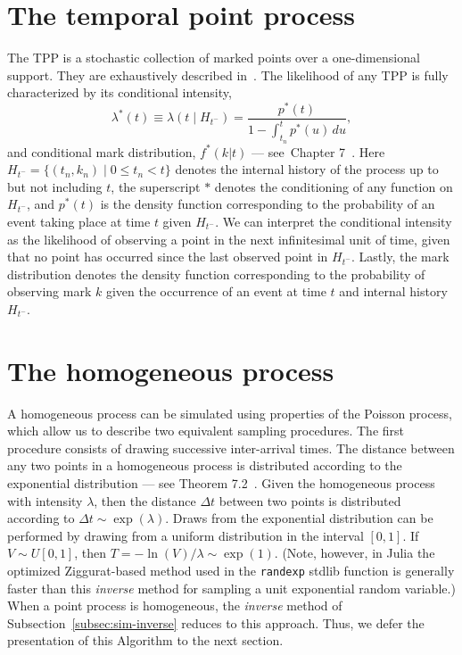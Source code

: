 \documentclass{juliacon}
\numberwithin{equation}{section}
\begin{document}
\section{The temporal point process} \label{sec:notation}

The TPP is a stochastic collection of marked points over a one-dimensional support. They are exhaustively described in~\cite{daley2003}. The likelihood of any TPP is fully characterized by its conditional intensity,
\begin{equation}\label{eq:lambda}
  \lambda^\ast (t) \equiv \lambda(t \mid H_{t^-} ) = \frac{p^\ast(t)}{1 - \int_{t_n}^{t} p^\ast(u) \, du},
\end{equation}
and conditional mark distribution, \( f^*(k | t) \) --- see~Chapter 7~\cite{daley2003}. Here \( H_{t^-} = \{ (t_n, k_n) \mid 0 \leq t_n < t \} \) denotes the internal history of the process up to but not including \( t \), the superscript \( \ast \) denotes the conditioning of any function on \( H_{t^-} \), and \( p^\ast(t) \) is the density function corresponding to the probability of an event taking place at time \( t \) given \( H_{t^-} \). We can interpret the conditional intensity as the likelihood of observing a point in the next infinitesimal unit of time, given that no point has occurred since the last observed point in \( H_{t^-} \). Lastly, the mark distribution denotes the density function corresponding to the probability of observing mark \( k \) given the occurrence of an event at time \( t \) and internal history \( H_{t^-} \).

\section{The homogeneous process} \label{sec:method-poisson}

A homogeneous process can be simulated using properties of the Poisson process, which allow us to describe two equivalent sampling procedures. The first procedure consists of drawing successive inter-arrival times. The distance between any two points in a homogeneous process is distributed according to the exponential distribution --- see Theorem 7.2~\cite{last2017}. Given the homogeneous process with intensity $\lambda$, then the distance \( \Delta t \) between two points is distributed according to $\Delta t \sim \exp(\lambda)$. Draws from the exponential distribution can be performed by drawing from a uniform distribution in the interval $[0, 1]$. If $V \sim U[0, 1]$, then \( T = - \ln(V) / \lambda \sim \exp(1) \). (Note, however, in Julia the optimized Ziggurat-based method used in the \texttt{randexp} stdlib function is generally faster than this \textit{inverse} method for sampling a unit exponential random variable.) When a point process is homogeneous, the \textit{inverse} method of Subsection~\ref{subsec:sim-inverse} reduces to this approach. Thus, we defer the presentation of this Algorithm to the next section.
\end{document}
